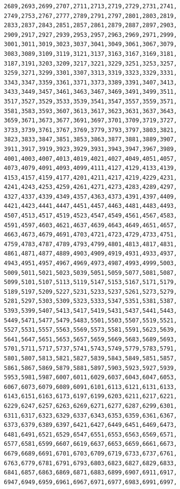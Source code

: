 \documentclass{article}
\begin{document}
\begin{lstlisting}[caption=\texttt{maths.lib}]
2689,2693,2699,2707,2711,2713,2719,2729,2731,2741,
2749,2753,2767,2777,2789,2791,2797,2801,2803,2819,
2833,2837,2843,2851,2857,2861,2879,2887,2897,2903,
2909,2917,2927,2939,2953,2957,2963,2969,2971,2999,
3001,3011,3019,3023,3037,3041,3049,3061,3067,3079,
3083,3089,3109,3119,3121,3137,3163,3167,3169,3181,
3187,3191,3203,3209,3217,3221,3229,3251,3253,3257,
3259,3271,3299,3301,3307,3313,3319,3323,3329,3331,
3343,3347,3359,3361,3371,3373,3389,3391,3407,3413,
3433,3449,3457,3461,3463,3467,3469,3491,3499,3511,
3517,3527,3529,3533,3539,3541,3547,3557,3559,3571,
3581,3583,3593,3607,3613,3617,3623,3631,3637,3643,
3659,3671,3673,3677,3691,3697,3701,3709,3719,3727,
3733,3739,3761,3767,3769,3779,3793,3797,3803,3821,
3823,3833,3847,3851,3853,3863,3877,3881,3889,3907,
3911,3917,3919,3923,3929,3931,3943,3947,3967,3989,
4001,4003,4007,4013,4019,4021,4027,4049,4051,4057,
4073,4079,4091,4093,4099,4111,4127,4129,4133,4139,
4153,4157,4159,4177,4201,4211,4217,4219,4229,4231,
4241,4243,4253,4259,4261,4271,4273,4283,4289,4297,
4327,4337,4339,4349,4357,4363,4373,4391,4397,4409,
4421,4423,4441,4447,4451,4457,4463,4481,4483,4493,
4507,4513,4517,4519,4523,4547,4549,4561,4567,4583,
4591,4597,4603,4621,4637,4639,4643,4649,4651,4657,
4663,4673,4679,4691,4703,4721,4723,4729,4733,4751,
4759,4783,4787,4789,4793,4799,4801,4813,4817,4831,
4861,4871,4877,4889,4903,4909,4919,4931,4933,4937,
4943,4951,4957,4967,4969,4973,4987,4993,4999,5003,
5009,5011,5021,5023,5039,5051,5059,5077,5081,5087,
5099,5101,5107,5113,5119,5147,5153,5167,5171,5179,
5189,5197,5209,5227,5231,5233,5237,5261,5273,5279,
5281,5297,5303,5309,5323,5333,5347,5351,5381,5387,
5393,5399,5407,5413,5417,5419,5431,5437,5441,5443,
5449,5471,5477,5479,5483,5501,5503,5507,5519,5521,
5527,5531,5557,5563,5569,5573,5581,5591,5623,5639,
5641,5647,5651,5653,5657,5659,5669,5683,5689,5693,
5701,5711,5717,5737,5741,5743,5749,5779,5783,5791,
5801,5807,5813,5821,5827,5839,5843,5849,5851,5857,
5861,5867,5869,5879,5881,5897,5903,5923,5927,5939,
5953,5981,5987,6007,6011,6029,6037,6043,6047,6053,
6067,6073,6079,6089,6091,6101,6113,6121,6131,6133,
6143,6151,6163,6173,6197,6199,6203,6211,6217,6221,
6229,6247,6257,6263,6269,6271,6277,6287,6299,6301,
6311,6317,6323,6329,6337,6343,6353,6359,6361,6367,
6373,6379,6389,6397,6421,6427,6449,6451,6469,6473,
6481,6491,6521,6529,6547,6551,6553,6563,6569,6571,
6577,6581,6599,6607,6619,6637,6653,6659,6661,6673,
6679,6689,6691,6701,6703,6709,6719,6733,6737,6761,
6763,6779,6781,6791,6793,6803,6823,6827,6829,6833,
6841,6857,6863,6869,6871,6883,6899,6907,6911,6917,
6947,6949,6959,6961,6967,6971,6977,6983,6991,6997,

\end{lstlisting}
\end{document}
